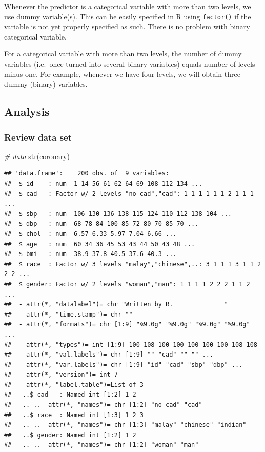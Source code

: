\documentclass[
]{book}
\makeatletter
\newenvironment{Shaded}{\begin{snugshade}}{\end{snugshade}}
\newcommand{\CommentTok}[1]{\textcolor[rgb]{0.37,0.37,0.37}{\textit{#1}}}
\newcommand{\FunctionTok}[1]{\textcolor[rgb]{0,0,0}{#1}}
\newcommand{\NormalTok}[1]{#1}
\newenvironment{kframe}{%
\medskip{}
\setlength{\fboxsep}{.8em}
 \def\at@end@of@kframe{}%
 \ifinner\ifhmode%
  \def\at@end@of@kframe{\end{minipage}}%
  \begin{minipage}{\columnwidth}%
 \fi\fi%
 \def\FrameCommand##1{\hskip\@totalleftmargin \hskip-\fboxsep
 \colorbox{shadecolor}{##1}\hskip-\fboxsep
     \hskip-\linewidth \hskip-\@totalleftmargin \hskip\columnwidth}%
 \MakeFramed {\advance\hsize-\width
   \@totalleftmargin\z@ \linewidth\hsize
   \@setminipage}}%
 {\par\unskip\endMakeFramed%
 \at@end@of@kframe}
\renewenvironment{Shaded}{\begin{kframe}}{\end{kframe}}
\makeatother
\begin{document}
Whenever the predictor is a categorical variable with more than two levels, we use dummy variable(s). This can be easily specified in R using \texttt{factor()} if the variable is not yet properly specified as such. There is no problem with binary categorical variable.

For a categorical variable with more than two levels, the number of dummy variables (i.e.~once turned into several binary variables) equals number of levels minus one. For example, whenever we have four levels, we will obtain three dummy (binary) variables.

\hypertarget{analysis-1}{%
\subsection{Analysis}\label{analysis-1}}

\hypertarget{review-data-set}{%
\subsubsection{Review data set}\label{review-data-set}}

\begin{Shaded}
\begin{Highlighting}[]
\CommentTok{\# data}
\FunctionTok{str}\NormalTok{(coronary)}
\end{Highlighting}
\end{Shaded}

\begin{verbatim}
## 'data.frame':    200 obs. of  9 variables:
##  $ id    : num  1 14 56 61 62 64 69 108 112 134 ...
##  $ cad   : Factor w/ 2 levels "no cad","cad": 1 1 1 1 1 1 2 1 1 1 ...
##  $ sbp   : num  106 130 136 138 115 124 110 112 138 104 ...
##  $ dbp   : num  68 78 84 100 85 72 80 70 85 70 ...
##  $ chol  : num  6.57 6.33 5.97 7.04 6.66 ...
##  $ age   : num  60 34 36 45 53 43 44 50 43 48 ...
##  $ bmi   : num  38.9 37.8 40.5 37.6 40.3 ...
##  $ race  : Factor w/ 3 levels "malay","chinese",..: 3 1 1 1 3 1 1 2 2 2 ...
##  $ gender: Factor w/ 2 levels "woman","man": 1 1 1 1 2 2 2 1 1 2 ...
##  - attr(*, "datalabel")= chr "Written by R.              "
##  - attr(*, "time.stamp")= chr ""
##  - attr(*, "formats")= chr [1:9] "%9.0g" "%9.0g" "%9.0g" "%9.0g" ...
##  - attr(*, "types")= int [1:9] 100 108 100 100 100 100 100 108 108
##  - attr(*, "val.labels")= chr [1:9] "" "cad" "" "" ...
##  - attr(*, "var.labels")= chr [1:9] "id" "cad" "sbp" "dbp" ...
##  - attr(*, "version")= int 7
##  - attr(*, "label.table")=List of 3
##   ..$ cad   : Named int [1:2] 1 2
##   .. ..- attr(*, "names")= chr [1:2] "no cad" "cad"
##   ..$ race  : Named int [1:3] 1 2 3
##   .. ..- attr(*, "names")= chr [1:3] "malay" "chinese" "indian"
##   ..$ gender: Named int [1:2] 1 2
##   .. ..- attr(*, "names")= chr [1:2] "woman" "man"
\end{verbatim}
\end{document}
